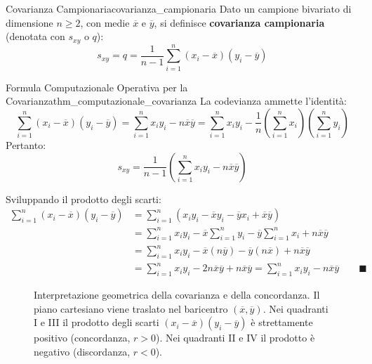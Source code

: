\begin{definizione}{Covarianza Campionaria}{covarianza_campionaria}
Dato un campione bivariato di dimensione $n \ge 2$, con medie $\overline{x}$ e $\overline{y}$, si definisce \textbf{covarianza campionaria} (denotata con $s_{xy}$ o $q$):
\begin{equation}
s_{xy} = q = \frac{1}{n-1}\sum_{i=1}^n (x_i - \overline{x})(y_i - \overline{y})
\end{equation}
\end{definizione}

\begin{teorema}{Formula Computazionale Operativa per la Covarianza}{thm_computazionale_covarianza}
La codevianza ammette l'identità:
\begin{equation}
\sum_{i=1}^n (x_i - \overline{x})(y_i - \overline{y}) = \sum_{i=1}^n x_i y_i - n\overline{x}\overline{y} = \sum_{i=1}^n x_i y_i - \frac{1}{n}\left(\sum_{i=1}^n x_i\right)\left(\sum_{i=1}^n y_i\right)
\end{equation}
Pertanto:
\begin{equation}
s_{xy} = \frac{1}{n-1}\left( \sum_{i=1}^n x_i y_i - n\overline{x}\overline{y} \right)
\end{equation}
\end{teorema}

\begin{dimostrazione}
Sviluppando il prodotto degli scarti:
\begin{align}
\sum_{i=1}^n (x_i - \overline{x})(y_i - \overline{y}) &= \sum_{i=1}^n \left( x_i y_i - \overline{x}y_i - \overline{y}x_i + \overline{x}\overline{y} \right) \\
&= \sum_{i=1}^n x_i y_i - \overline{x}\sum_{i=1}^n y_i - \overline{y}\sum_{i=1}^n x_i + n\overline{x}\overline{y} \\
&= \sum_{i=1}^n x_i y_i - \overline{x}(n\overline{y}) - \overline{y}(n\overline{x}) + n\overline{x}\overline{y} \\
&= \sum_{i=1}^n x_i y_i - 2n\overline{x}\overline{y} + n\overline{x}\overline{y} = \sum_{i=1}^n x_i y_i - n\overline{x}\overline{y} \qquad \blacksquare
\end{align}
\end{dimostrazione}

\begin{figure}[htbp]
\centering

\caption{Interpretazione geometrica della covarianza e della concordanza. Il piano cartesiano viene traslato nel baricentro $(\overline{x}, \overline{y})$. Nei quadranti I e III il prodotto degli scarti $(x_i - \overline{x})(y_i - \overline{y})$ è strettamente positivo (concordanza, $r > 0$). Nei quadranti II e IV il prodotto è negativo (discordanza, $r < 0$).}
\label{fig:scatter_quadranti_correlazione}
\end{figure}

